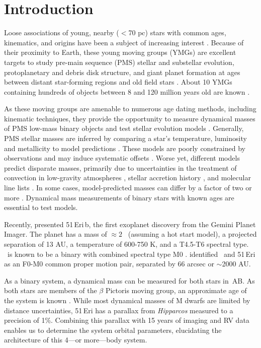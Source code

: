 
\section{Introduction}
\label{sec:intro-6}

Loose associations
of young, nearby ($<$70 pc) stars with common ages,
kinematics, and origins have been a subject of increasing interest
\citep{Zuckerman04, Shkolnik12, Malo13}.
Because of their proximity to Earth, these young
moving groups (YMGs) are excellent targets to study pre-main sequence (PMS)
stellar and substellar evolution, protoplanetary and debris disk structure,
and giant planet formation at ages between distant
star-forming regions and old field stars \citep[e.g.][]{Close05, Nielsen10}. 
About 10 YMGs containing hundreds of objects between 8 and 120 million years old 
are known \citep[e.g.][]{Torres08}.

As these moving groups are amenable to numerous age dating methods, including kinematic techniques, 
they provide the opportunity 
to measure dynamical masses of PMS low-mass binary 
objects and test stellar evolution models \citep{Stassun14}.
Generally, PMS stellar
masses are inferred by comparing a star's temperature,
luminosity and metallicity to model predictions
\citep[e.g.][]{Schaefer14}. 
These models
are poorly constrained by observations and may induce systematic
offsets \citep{Dupuy09, Dupuy14}. 
Worse yet, different models predict disparate masses, primarily
due to uncertainties in the treatment of convection in
low-gravity atmospheres \citep{Baraffe02}, stellar
accretion history \citep{Baraffe10}, and molecular line lists
\citep{Baraffe15}.
In some cases, model-predicted masses can differ by a factor of two or
more \citep{Hillenbrand04, Schlieder14}. 
Dynamical mass measurements of binary stars with known ages 
are essential to test models. 


Recently, \citet{Macintosh15} presented 51\,Eri\,b, the first
exoplanet discovery from the Gemini Planet Imager.
The planet has a mass of $\approx 2$ \mjup\ (assuming a hot start model), 
a projected separation of 13 AU,
a temperature of 600-750 K, and a T4.5-T6 spectral type.
\thisstarsix\ is known to be a binary with combined spectral type M0 
\citep{Kasper07}.
\citet{Feigelson06} identified \thisstarsix\ and 51\,Eri as an F0-M0 common proper motion pair, 
separated by $66$ arcsec or $\sim$2000 AU.

As a binary system,
a dynamical mass can be measured for both stars in \thisstarsix\,AB. 
As both stars are members of the $\beta$ Pictoris moving group, an approximate age of
the system is known \citep[$24 \pm 3$ Myr;][]{Binks14, Mamajek14, Bell15}.
While most dynamical masses of M dwarfs are limited by distance uncertainties, 
51\,Eri has a parallax from \textit{Hipparcos} measured
to a precision of 1\%.
Combining this parallax with 15 years of imaging and RV data enables us to determine
the system orbital parameters, elucidating
the architecture of this 4---or more---body system.

